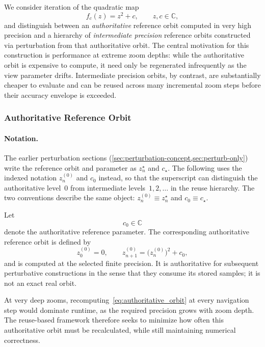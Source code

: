 We consider iteration of the quadratic map
\[
f_c(z) = z^2 + c,\qquad z,c \in \mathbb{C},
\]
and distinguish between an \emph{authoritative} reference orbit computed in very high precision and a hierarchy of
\emph{intermediate precision} reference orbits constructed via perturbation from that authoritative orbit.
The central motivation for this construction is performance at extreme zoom depths: while the authoritative orbit
is expensive to compute, it need only be regenerated infrequently as the view parameter drifts.
Intermediate precision orbits, by contrast, are substantially cheaper to evaluate and can be reused across many
incremental zoom steps before their accuracy envelope is exceeded.

\subsubsection{Authoritative Reference Orbit}

\paragraph{Notation.}
The earlier perturbation sections
(\cref{sec:perturbation-concept,sec:perturb-only})
write the reference orbit and parameter as
\(z_n^\star\) and \(c_\star\).
The following uses the indexed notation
\(z^{(0)}_n\) and \(c_0\) instead, so that the superscript can
distinguish the authoritative level~\(0\) from intermediate
levels~\(1,2,\ldots\) in the reuse hierarchy.
The two conventions describe the same object:
\(z^{(0)}_n \equiv z_n^\star\) and \(c_0 \equiv c_\star\).

Let
\[
c_0 \in \mathbb{C}
\]
denote the authoritative reference parameter.
The corresponding authoritative reference orbit is defined by
\begin{equation}
z^{(0)}_0 = 0, \qquad
z^{(0)}_{n+1} = \bigl(z^{(0)}_n\bigr)^2 + c_0,
\label{eq:authoritative_orbit}
\end{equation}
and is computed at the selected finite precision.  It is authoritative for
subsequent perturbative constructions in the sense that they consume its stored
samples; it is not an exact real orbit.

At very deep zooms, recomputing~\eqref{eq:authoritative_orbit} at every navigation step would dominate runtime,
as the required precision grows with zoom depth.
The reuse-based framework therefore seeks to minimize how often this authoritative orbit must be recalculated,
while still maintaining numerical correctness.

